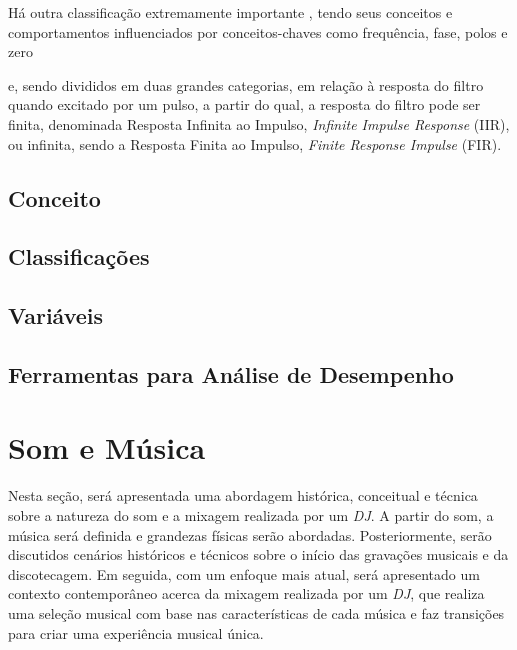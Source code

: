 Há outra classificação extremamente importante
, tendo seus conceitos e comportamentos influenciados por conceitos-chaves como frequência, fase, polos e zero



e, sendo divididos em duas grandes categorias, em relação à resposta do filtro quando excitado por um pulso, a partir do qual, a resposta do filtro pode ser finita, denominada Resposta Infinita ao Impulso, \textit{Infinite Impulse Response} (IIR), ou infinita, sendo a Resposta Finita ao Impulso, \textit{Finite Response Impulse} (FIR).



\subsection{Conceito}

\subsection{Classificações}

\subsection{Variáveis}

\subsection{Ferramentas para Análise de Desempenho}


\section{Som e Música}
Nesta seção, será apresentada uma abordagem histórica, conceitual e técnica sobre a natureza do som e a mixagem realizada por um \textit{DJ}. A partir do som, a música será definida e grandezas físicas serão abordadas. Posteriormente, serão discutidos cenários históricos e técnicos sobre o início das gravações musicais e da discotecagem. Em seguida, com um enfoque mais atual, será apresentado um contexto contemporâneo acerca da mixagem realizada por um \textit{DJ}, que realiza uma seleção musical com base nas características de cada música e faz transições para criar uma experiência musical única.

